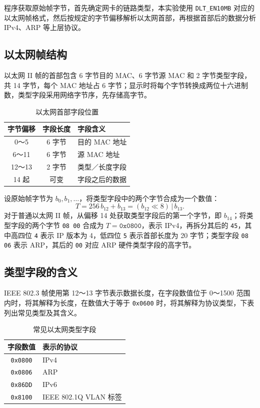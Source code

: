 \documentclass[UTF8,a4paper,11pt,scheme=chinese]{ctexart}
\newcommand{\code}[1]{\texttt{#1}}
\newcommand{\enhex}[1]{\texttt{#1}}
\begin{document}
程序获取原始帧字节，首先确定网卡的链路类型，本实验使用 \code{DLT\_EN10MB} 对应的以太网帧格式，然后按规定的字节偏移解析以太网首部，再根据首部后的数据分析 IPv4、ARP 等上层协议。

\subsection{以太网帧结构}
以太网 II 帧的首部包含 6 字节目的 MAC、6 字节源 MAC 和 2 字节类型字段，共 14 字节，每个 MAC 地址占 6 字节；显示时将每个字节转换成两位十六进制数，类型字段采用网络字节序，先存储高字节。
\begin{table}[H]\centering\small
\begin{tabularx}{\linewidth}{c c X}\toprule
字节偏移&字段长度&字段含义\\\midrule
0～5&6 字节&目的 MAC 地址\\
6～11&6 字节&源 MAC 地址\\
12～13&2 字节&类型／长度字段\\
14 起&可变&字段之后的数据\\\bottomrule
\end{tabularx}
\caption{以太网首部字段位置}\end{table}

设原始帧字节为 \(b_0,b_1,\ldots\)，将类型字段中的两个字节合成为一个数值：
\[
T=256\,b_{12}+b_{13}=(b_{12}\ll 8)\,\vert\,b_{13}.
\]
对于普通以太网 II 帧，从偏移 14 处获取类型字段后的第一个字节，即 \(b_{14}\)；将类型字段的两个字节 \enhex{08 00} 合成为 \(T=\texttt{0x0800}\)，表示 IPv4，再拆分其后的 \enhex{45}，其中高四位 \enhex{4} 表示 IP 版本为 4，低四位 \enhex{5} 表示首部长度为 20 字节；类型字段 \enhex{08 06} 表示 ARP，其后的 \enhex{00} 对应 ARP 硬件类型字段的高字节。

\subsection{类型字段的含义}
IEEE 802.3 帧使用第 12～13 字节表示数据长度，在字段数值位于 0～1500 范围内时，将其解释为长度，在数值大于等于 \enhex{0x0600} 时，将其解释为协议类型，下表列出常见类型及其含义。
\begin{table}[H]\centering\small
\begin{tabularx}{\linewidth}{c X}\toprule
字段数值&表示的协议\\\midrule
\enhex{0x0800}&IPv4\\
\enhex{0x0806}&ARP\\
\enhex{0x86DD}&IPv6\\
\enhex{0x8100}&IEEE 802.1Q VLAN 标签\\\bottomrule
\end{tabularx}
\caption{常见以太网类型字段}\end{table}
\end{document}
